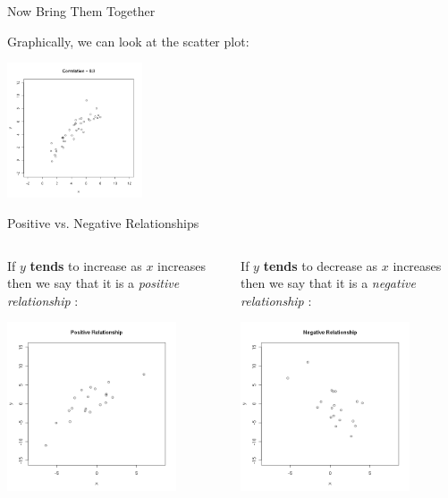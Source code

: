 \begin{frame}{Now Bring Them Together}

  Graphically, we can look at the scatter plot:

  \includegraphics[height=4cm]{img/correlation09}
  
\end{frame}



\begin{frame}{Positive vs. Negative Relationships}

  \begin{columns}

    \begin{definition}
      If $y$ \textbf{tends} to increase as $x$ increases then we say
      that it is a \textit{positive relationship} : \\
      \centerline{\includegraphics[width=5cm]{img/positiveRelationship}}
    \end{definition}


    \begin{definition}
      If $y$ \textbf{tends} to decrease as $x$ increases then we say
      that it is a \textit{negative relationship} : \\
      \centerline{\includegraphics[width=5cm]{img/negativeRelationship}}
    \end{definition}

  \end{columns}
  
\end{frame}


